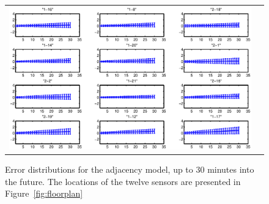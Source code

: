 \begin{figure}
\begin{tabular}{cc}
\begin{minipage}{\linewidth}
\includegraphics[width=0.6\columnwidth]{fig/PooledAdjError.eps}
\caption[Error distribution for the adjacency model.]{Error distributions for
  the adjacency model, up to 30 minutes into the future. The locations of the
  twelve sensors are presented in Figure~\ref{fig:floorplan}}
\label{fig:adjerror}
\end{minipage}
\end{tabular}
\end{figure}
